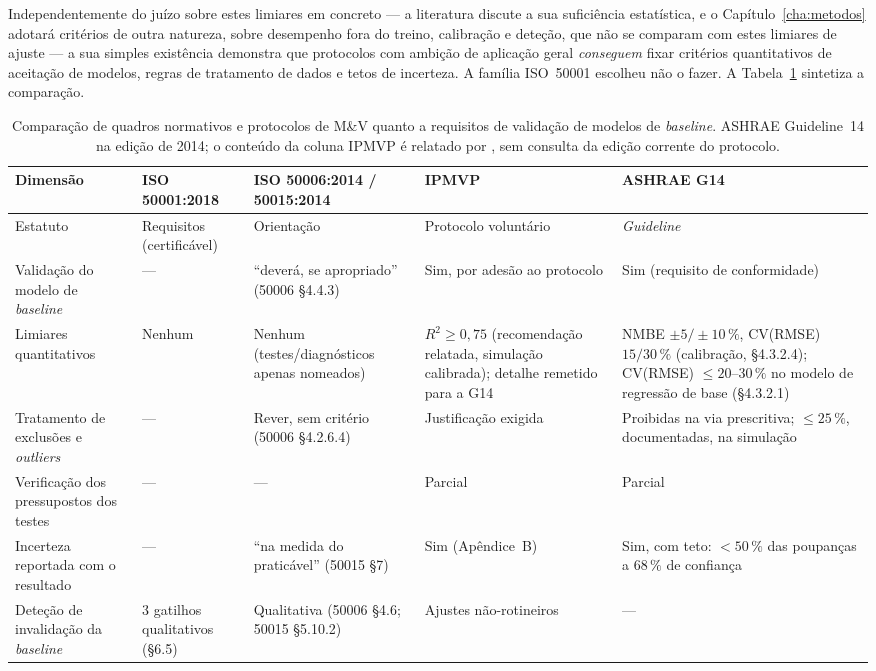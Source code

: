Independentemente do juízo sobre estes limiares em concreto --- a literatura discute a sua suficiência estatística, e o Capítulo~\ref{cha:metodos} adotará critérios de outra natureza, sobre desempenho fora do treino, calibração e deteção, que não se comparam com estes limiares de ajuste --- a sua simples existência demonstra que protocolos com ambição de aplicação geral \emph{conseguem} fixar critérios quantitativos de aceitação de modelos, regras de tratamento de dados e tetos de incerteza. A família ISO~50001 escolheu não o fazer. A Tabela~\ref{tab:comparacao-frameworks} sintetiza a comparação.

\begin{table}[htbp]
  \centering\footnotesize
  \caption[Comparação de quadros normativos quanto a requisitos de validação]{Comparação de quadros normativos e protocolos de M\&V quanto a requisitos de validação de modelos de \emph{baseline}. ASHRAE Guideline~14 na edição de 2014; o conteúdo da coluna IPMVP é relatado por \textcite{RuizBandera2017}, sem consulta da edição corrente do protocolo.}
  \label{tab:comparacao-frameworks}
  \begin{tabularx}{\textwidth}{@{}>{\raggedright\arraybackslash}p{3.2cm} X X X X@{}}
    \toprule
    \textbf{Dimensão} & \textbf{ISO 50001:2018} & \textbf{ISO 50006:2014 / 50015:2014} & \textbf{IPMVP} & \textbf{ASHRAE G14} \\
    \midrule
    Estatuto & Requisitos (certificável) & Orientação & Protocolo voluntário & \emph{Guideline} \\
    Validação do modelo de \emph{baseline} & --- & \enquote{deverá, se apropriado} (50006 \S4.4.3) & Sim, por adesão ao protocolo & Sim (requisito de conformidade) \\
    Limiares quantitativos & Nenhum & Nenhum (testes/diagnósticos apenas nomeados) & $R^2 \geq 0{,}75$ (recomendação relatada, simulação calibrada); detalhe remetido para a G14 & NMBE $\pm5/\pm10\,\%$, CV(RMSE) $15/30\,\%$ (calibração, \S4.3.2.4); CV(RMSE) $\leq 20$--$30\,\%$ no modelo de regressão de base (\S4.3.2.1) \\
    Tratamento de exclusões e \emph{outliers} & --- & Rever, sem critério (50006 \S4.2.6.4) & Justificação exigida & Proibidas na via prescritiva; $\leq 25\,\%$, documentadas, na simulação \\
    Verificação dos pressupostos dos testes & --- & --- & Parcial & Parcial \\
    Incerteza reportada com o resultado & --- & \enquote{na medida do praticável} (50015 \S7) & Sim (Apêndice~B) & Sim, com teto: $<50\,\%$ das poupanças a $68\,\%$ de confiança \\
    Deteção de invalidação da \emph{baseline} & 3 gatilhos qualitativos (\S6.5) & Qualitativa (50006 \S4.6; 50015 \S5.10.2) & Ajustes não-rotineiros & --- \\
    \bottomrule
  \end{tabularx}
\end{table}

